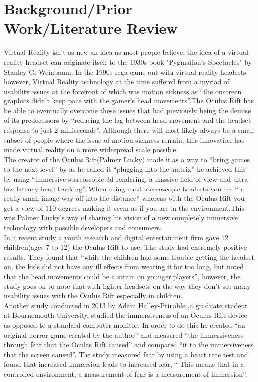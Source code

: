 \documentclass[a4paper]{article}
\begin{document}
\section{Background/Prior Work/Literature Review}


\indent \indent Virtual Reality isn’t as new an idea as most people believe, the idea of a virtual reality headset can originate itself to the 1930s book "Pygmalion's Spectacles" by Stanley G. Weinbaum\cite{1}. In the 1990s sega came out with virtual reality headsets however, Virtual Reality technology at the time suffered from a myriad of usability issues at the forefront of which was motion sickness as “the onscreen graphics didn’t keep pace with the gamer’s head movements”\cite{2}.The Oculus Rift has be able to eventually overcome these issues that had previously being the demise of its predecessors by “reducing the lag between head movement and the headset response to just 2 milliseconds”\cite{2}. Although there will most likely always be a small subset of people where the issue of motion sickness remain, this  innovation has made virtual reality on a more widespread scale possible.\\
\indent The creator of the Oculus Rift(Palmer Lucky) made it as a way to “bring games to the next level” by as he called it “plugging into the matrix” he achieved this by using “immersive stereoscopic 3d rendering, a massive field of view and ultra low latency head tracking”\cite{3}. When using most stereoscopic headsets you see “ a really small image way off into the distance” whereas with the Oculus Rift you get a view of 110 degrees making it seem as if you are in the environment\cite{3}.This was Palmer Lucky’s way of sharing his vision of a new completely immersive technology with possible developers and consumers.\\
\indent In a recent study a youth research and digital entertainment firm gave 12 children(ages 7 to 12) the Oculus Rift to use. The study had extremely positive results. They found that “while the children had some trouble getting the headset on, the kids did not have any ill effects from wearing it for too long, but noted that the head movements could be a strain on younger players”\cite{4}, however, the study goes on to note that with lighter headsets on the way they don’t see many usability issues with the Oculus Rift especially in children.\\
\indent Another study conducted in 2013 by Adam Halley-Prinable ,a graduate student at Bournemouth University, studied the immersiveness of an Oculus Rift device as opposed to a standard computer monitor. In order to do this he created “an original horror game created by the author” and measured “the immersiveness through fear that the Oculus Rift caused” and compared “it to the immersiveness that the screen caused”\cite{7}.  The study measured fear by using a heart rate test and found that increased immersion leads to increased fear, “ This means that in a controlled environment, a measurement of fear is a measurement of immersion”\cite{7}. 
\end{document}
